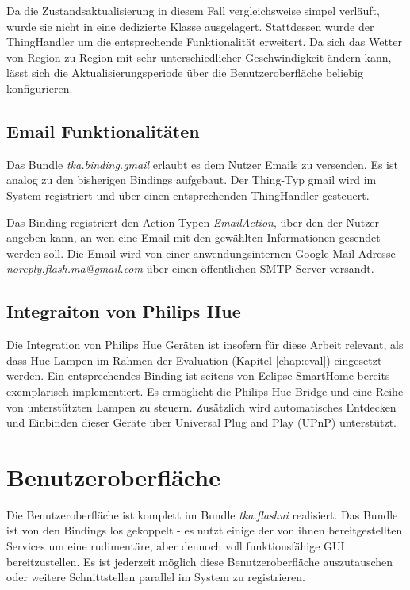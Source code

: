 Da die Zustandsaktualisierung in diesem Fall vergleichsweise simpel verläuft, wurde sie nicht in eine dedizierte Klasse ausgelagert. Stattdessen wurde der ThingHandler um die entsprechende Funktionalität erweitert. Da sich das Wetter von Region zu Region mit sehr unterschiedlicher Geschwindigkeit ändern kann, lässt sich die Aktualisierungsperiode über die Benutzeroberfläche beliebig konfigurieren.


\subsection{Email Funktionalitäten}
Das Bundle \textit{tka.binding.gmail} erlaubt es dem Nutzer Emails zu versenden. Es ist analog zu den bisherigen Bindings aufgebaut. Der Thing-Typ \glqq gmail\grqq{} wird im System registriert und über einen entsprechenden ThingHandler gesteuert. 

Das Binding registriert den Action Typen \textit{EmailAction}, über den der Nutzer angeben kann, an wen eine Email mit den gewählten Informationen gesendet werden soll. Die Email wird von einer anwendungsinternen Google Mail\cite{gmail} Adresse \textit{noreply.flash.ma@gmail.com} über einen öffentlichen SMTP Server versandt.


\subsection{Integraiton von Philips Hue}
Die Integration von Philips Hue Geräten ist insofern für diese Arbeit relevant, als dass Hue Lampen im Rahmen der Evaluation (Kapitel \ref{chap:eval}) eingesetzt werden. Ein entsprechendes Binding ist seitens von Eclipse SmartHome bereits exemplarisch implementiert. Es ermöglicht die Philips Hue Bridge und eine Reihe von unterstützten Lampen zu steuern. Zusätzlich wird automatisches Entdecken und Einbinden dieser Geräte über Universal Plug and Play (UPnP) unterstützt.


\section{Benutzeroberfläche}
Die Benutzeroberfläche ist komplett im Bundle \textit{tka.flashui} realisiert. Das Bundle ist von den Bindings los gekoppelt - es nutzt einige der von ihnen bereitgestellten Services um eine rudimentäre, aber dennoch voll funktionsfähige GUI bereitzustellen. Es ist jederzeit möglich diese Benutzeroberfläche auszutauschen oder weitere Schnittstellen parallel im System zu registrieren.\\

